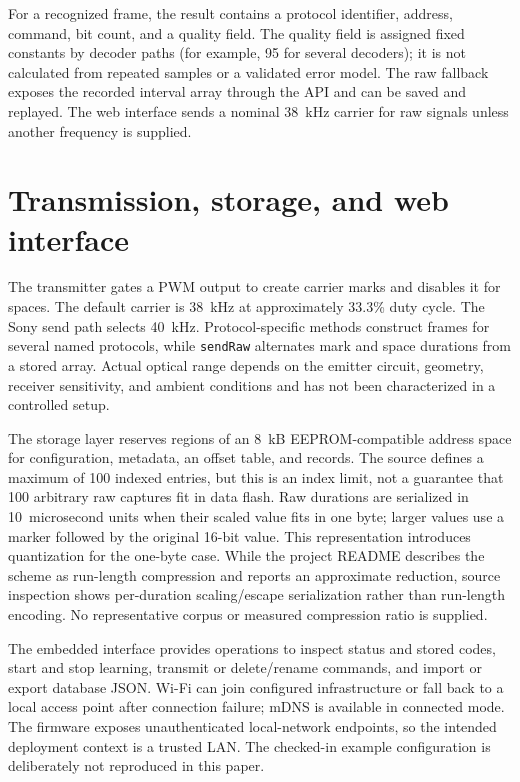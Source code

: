 \documentclass[11pt]{article}
\begin{document}
For a recognized frame, the result contains a protocol identifier, address, command, bit count, and a quality field. The quality field is assigned fixed constants by decoder paths (for example, 95 for several decoders); it is not calculated from repeated samples or a validated error model. The raw fallback exposes the recorded interval array through the API and can be saved and replayed. The web interface sends a nominal 38~kHz carrier for raw signals unless another frequency is supplied.

\section{Transmission, storage, and web interface}
The transmitter gates a PWM output to create carrier marks and disables it for spaces. The default carrier is 38~kHz at approximately 33.3\% duty cycle. The Sony send path selects 40~kHz. Protocol-specific methods construct frames for several named protocols, while \texttt{sendRaw} alternates mark and space durations from a stored array. Actual optical range depends on the emitter circuit, geometry, receiver sensitivity, and ambient conditions and has not been characterized in a controlled setup.

The storage layer reserves regions of an 8~kB EEPROM-compatible address space for configuration, metadata, an offset table, and records. The source defines a maximum of 100 indexed entries, but this is an index limit, not a guarantee that 100 arbitrary raw captures fit in data flash. Raw durations are serialized in 10~microsecond units when their scaled value fits in one byte; larger values use a marker followed by the original 16-bit value. This representation introduces quantization for the one-byte case. While the project README describes the scheme as run-length compression and reports an approximate reduction, source inspection shows per-duration scaling/escape serialization rather than run-length encoding. No representative corpus or measured compression ratio is supplied.

The embedded interface provides operations to inspect status and stored codes, start and stop learning, transmit or delete/rename commands, and import or export database JSON. Wi-Fi can join configured infrastructure or fall back to a local access point after connection failure; mDNS is available in connected mode. The firmware exposes unauthenticated local-network endpoints, so the intended deployment context is a trusted LAN. The checked-in example configuration is deliberately not reproduced in this paper.
\end{document}
